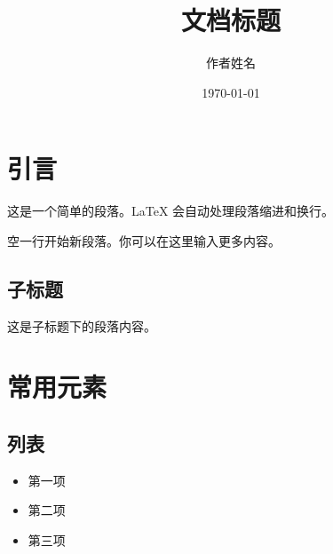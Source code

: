 \documentclass[UTF8]{ctexart}
\title{文档标题}
\author{作者姓名}
\date{\today}
\begin{document}
\maketitle



\section{引言}

这是一个简单的段落。LaTeX 会自动处理段落缩进和换行。

空一行开始新段落。你可以在这里输入更多内容。

\subsection{子标题}

这是子标题下的段落内容。


\section{常用元素}

\subsection{列表}

\begin{itemize}
    \item 第一项
    \item 第二项
    \item 第三项
\end{itemize}
\end{document}
